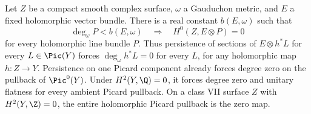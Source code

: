 
\begin{proposition}\label{cdp:st:A.5.6}
Let $Z$ be a compact smooth complex surface, $\omega$ a Gauduchon metric, and $E$ a fixed holomorphic vector bundle. There is a real constant $b(E,\omega)$ such that
\[
 \deg_\omega P<b(E,\omega)
 \quad\Longrightarrow\quad H^0(Z,E\otimes P)=0
 \tag{A.30}\label{cdp:eq:A.30}
\]
for every holomorphic line bundle $P$. Thus persistence of sections of $E\otimes h^*L$ for every $L\in\Pic(Y)$ forces $\deg_\omega h^*L=0$ for every $L$, for any holomorphic map $h:Z\to Y$. Persistence on one Picard component already forces degree zero on the pullback of $\Pic^0(Y)$. Under $H^2(Y,\Q)=0$, it forces degree zero and unitary flatness for every ambient Picard pullback. On a class VII surface $Z$ with $H^2(Y,\Z)=0$, the entire holomorphic Picard pullback is the zero map.
\end{proposition}
